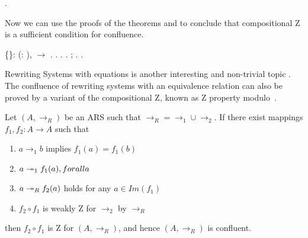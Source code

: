  \begin{coqdoccode}
\coqdocnoindent
{}.\coqdoceol
\coqdocemptyline
\end{coqdoccode}
Now we can use the proofs of the theorems 
and  to conclude that compositional Z is a
sufficient condition for confluence. \begin{coqdoccode}
\coqdocemptyline
\coqdocnoindent
{}  \{\}: \coqdockw{\ensuremath{\forall}} (:  ),   \ensuremath{\rightarrow}  .\coqdoceol
\coqdocnoindent
{}.\coqdoceol
\coqdocindent{1.00em}
  .\coqdoceol
\coqdocindent{1.00em}
   .\coqdoceol
\coqdocindent{1.00em}
 ; .\coqdoceol
\coqdocnoindent
{}.\coqdoceol
\coqdocemptyline
\end{coqdoccode}
Rewriting Systems with equations is another interesting and
    non-trivial topic \cite{winkler89,terese03}. The confluence of
    rewriting systems with an equivalence relation can also be proved
    by a variant of the compositional Z, known as Z property
    modulo~\cite{AK12b}.


    \begin{theorem}\label{cor:zcomp} Let
     $(A,\to_R)$ be an ARS such that $\to_R = \to_1 \cup \to_2$. If
     there exist mappings $f_1,f_2: A \to A$ such that
     \begin{enumerate} \item $a \to_1 b$ implies $f_1(a) = f_1(b)$
     \item $a \twoheadrightarrow_1 f_1(a), for all a$ \item $a \twoheadrightarrow_R f_2(a)$ holds
     for any $a\in Im(f_1)$ \item $f_2 \circ f_1$ is weakly Z for
     $\to_2$ by $\to_R$ \end{enumerate} then $f_2 \circ f_1$ is Z for
     $(A,\to_R)$, and hence $(A,\to_R)$ is confluent. \end{theorem}


